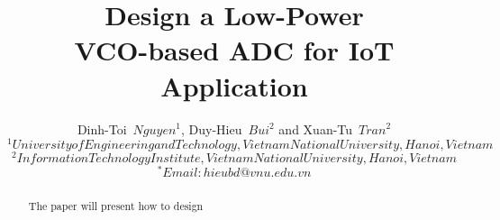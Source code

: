\documentclass[journal]{IEEEtran}
\begin{document}
\title{Design a Low-Power\\VCO-based ADC for IoT Application}

\author{Dinh-Toi~$Nguyen^{1}$, Duy-Hieu~$Bui^{2}$ and Xuan-Tu~$Tran^{2}$\\
$^{1}University of Engineering and Technology, Vietnam National University, Hanoi, Vietnam$\\
$^{2}Information Technology Institute, Vietnam National University, Hanoi, Vietnam$\\
$^{*}Email: hieubd@vnu.edu.vn$}



\maketitle

\begin{abstract}
The paper will present how to design 
\end{abstract}
\end{document}
